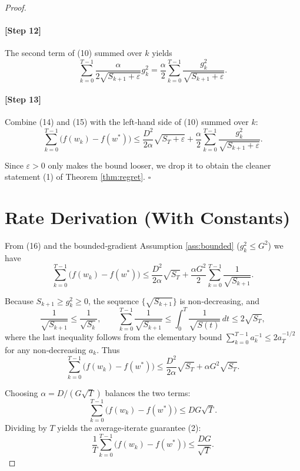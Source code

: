\documentclass{article}
\begin{document}
\begin{proof}
\paragraph{[Step 12]} The second term of (10) summed over $k$ yields
\[
\sum_{k=0}^{T-1}\frac{\alpha}{2\sqrt{S_{k+1}+\varepsilon}}g_{k}^{2}
   =\frac{\alpha}{2}\sum_{k=0}^{T-1}\frac{g_{k}^{2}}{\sqrt{S_{k+1}+\varepsilon}}.
\tag{15}
\]

\paragraph{[Step 13]} Combine (14) and (15) with the left‑hand side of (10) summed over $k$:
\[
\sum_{k=0}^{T-1}\bigl(f(w_{k})-f(w^{*})\bigr)
   \le \frac{D^{2}}{2\alpha}\sqrt{S_{T}+\varepsilon}
        +\frac{\alpha}{2}\sum_{k=0}^{T-1}\frac{g_{k}^{2}}{\sqrt{S_{k+1}+\varepsilon}}.
\tag{16}
\]

Since $\varepsilon>0$ only makes the bound looser, we drop it to obtain the cleaner statement (1) of Theorem \ref{thm:regret}. \hfill $\square$

\section*{Rate Derivation (With Constants)}
From (16) and the bounded‑gradient Assumption \ref{ass:bounded} ($g_{k}^{2}\le G^{2}$) we have
\[
\sum_{k=0}^{T-1}\bigl(f(w_{k})-f(w^{*})\bigr)
   \le \frac{D^{2}}{2\alpha}\sqrt{S_{T}}
        +\frac{\alpha G^{2}}{2}\sum_{k=0}^{T-1}\frac{1}{\sqrt{S_{k+1}}}.
\tag{17}
\]

Because $S_{k+1}\ge g_{k}^{2}\ge 0$, the sequence $\{\sqrt{S_{k+1}}\}$ is non‑decreasing, and
\[
\frac{1}{\sqrt{S_{k+1}}}\le\frac{1}{\sqrt{S_{k}}},\qquad
\sum_{k=0}^{T-1}\frac{1}{\sqrt{S_{k+1}}}
   \le \int_{0}^{T}\frac{1}{\sqrt{S(t)}}\,dt
   \le 2\sqrt{S_{T}},
\]
where the last inequality follows from the elementary bound
$\sum_{k=0}^{T-1} a_{k}^{-1}\le 2 a_{T}^{-1/2}$ for any non‑decreasing $a_{k}$.
Thus
\[
\sum_{k=0}^{T-1}\bigl(f(w_{k})-f(w^{*})\bigr)
   \le \frac{D^{2}}{2\alpha}\sqrt{S_{T}}
        +\alpha G^{2}\sqrt{S_{T}} .
\tag{18}
\]

Choosing $\alpha = D/(G\sqrt{T})$ balances the two terms:
\[
\sum_{k=0}^{T-1}\bigl(f(w_{k})-f(w^{*})\bigr)
   \le D G\sqrt{T}.
\tag{19}
\]
Dividing by $T$ yields the average‑iterate guarantee (2):
\[
\frac{1}{T}\sum_{k=0}^{T-1}\bigl(f(w_{k})-f(w^{*})\bigr)
   \le \frac{DG}{\sqrt{T}}.
\]


\end{proof}
\end{document}
